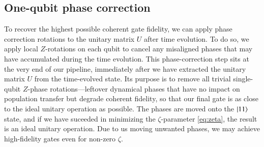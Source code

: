 \documentclass{subfiles}
\begin{document}
\subsection{One-qubit phase correction}\label{sec:phase_correction}
To recover the highest possible coherent gate fidelity, we can apply phase correction rotations to the unitary matrix $U$ after time evolution. To do so, we apply local $Z$-rotations on each qubit to cancel any misaligned phases that may have accumulated during the time evolution. This phase-correction step sits at the very end of our pipeline, immediately after we have extracted the unitary matrix $U$ from the time-evolved state. Its purpose is to remove all trivial single-qubit $Z$-phase rotations—leftover dynamical phases that have no impact on population transfer but degrade coherent fidelity, so that our final gate is as close to the ideal unitary operation as possible. The phases are moved onto the $\ket{11}$ state, and if we have suceeded in minimizing the $\zeta$-parameter \eqref{eq:zeta}, the result is an ideal unitary operation. Due to us moving unwanted phases, we may achieve high-fidelity gates even for non-zero $\zeta$. 
\end{document}
